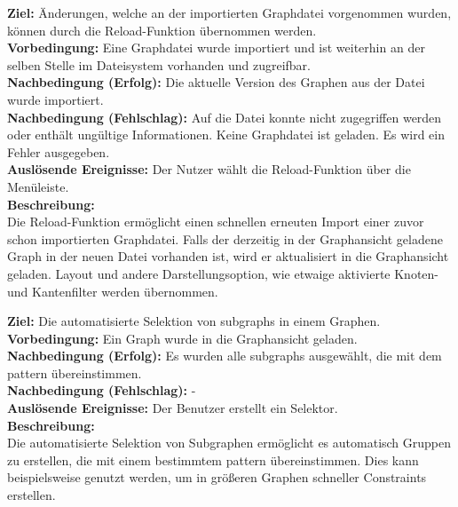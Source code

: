 \label{fa:reload}
\textbf{Ziel:} Änderungen, welche an der importierten Graphdatei vorgenommen wurden, können durch die Reload-Funktion übernommen werden.\\
\textbf{Vorbedingung:} Eine Graphdatei wurde importiert und ist weiterhin an der selben Stelle im Dateisystem vorhanden und zugreifbar.\\
\textbf{Nachbedingung (Erfolg):} Die aktuelle Version des Graphen aus der Datei wurde importiert.\\
\textbf{Nachbedingung (Fehlschlag):} Auf die Datei konnte nicht zugegriffen werden oder enthält ungültige Informationen. Keine Graphdatei ist geladen. Es wird ein Fehler ausgegeben.\\
\textbf{Auslösende Ereignisse:} Der Nutzer wählt die Reload-Funktion über die Menüleiste.\\
\textbf{Beschreibung:}\\
Die Reload-Funktion ermöglicht einen schnellen erneuten Import einer zuvor schon importierten Graphdatei.
Falls der derzeitig in der Graphansicht geladene Graph in der neuen Datei vorhanden ist, wird er aktualisiert in die Graphansicht geladen.
Layout und andere Darstellungsoption, wie etwaige aktivierte Knoten- und Kantenfilter werden übernommen.

\label{fa:gpm}
\textbf{Ziel:} Die automatisierte Selektion von \glspl{subgraph} in einem Graphen.\\
\textbf{Vorbedingung:} Ein Graph wurde in die Graphansicht geladen.\\
\textbf{Nachbedingung (Erfolg):} Es wurden alle \glspl{subgraph} ausgewählt, die mit dem \gls{pattern} übereinstimmen.\\
\textbf{Nachbedingung (Fehlschlag):} - \\
\textbf{Auslösende Ereignisse:} Der Benutzer erstellt ein Selektor.\\
\textbf{Beschreibung:}\\
Die automatisierte Selektion von Subgraphen ermöglicht es automatisch Gruppen zu erstellen, die mit einem bestimmtem \gls{pattern} übereinstimmen. Dies kann beispielsweise genutzt werden, um in größeren Graphen schneller Constraints erstellen.\\

